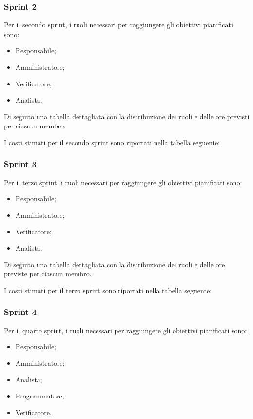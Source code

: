 \pagebreak 
\subsubsection{Sprint 2}
Per il secondo sprint, i ruoli necessari per raggiungere gli obiettivi
pianificati sono:
\begin{itemize}
    \item Responsabile;
    \item Amministratore;
    \item Verificatore;
    \item Analista.
\end{itemize}


Di seguito una tabella dettagliata con la distribuzione dei ruoli e delle ore previsti per ciascun membro.



I costi stimati per il secondo sprint sono riportati nella tabella seguente:



\pagebreak 
\subsubsection{Sprint 3}
Per il terzo sprint, i ruoli necessari per raggiungere gli obiettivi
pianificati sono:
\begin{itemize}
    \item Responsabile;
    \item Amministratore;
    \item Verificatore;
    \item Analista.
\end{itemize}


Di seguito una tabella dettagliata con la distribuzione dei ruoli e delle ore previste per ciascun membro.



I costi stimati per il terzo sprint sono riportati nella tabella seguente:



\pagebreak 
\subsubsection{Sprint 4}
Per il quarto sprint, i ruoli necessari per raggiungere gli obiettivi
pianificati sono:
\begin{itemize}
    \item Responsabile;
    \item Amministratore;
    \item Analista;
    \item Programmatore;
    \item Verificatore.
\end{itemize}


